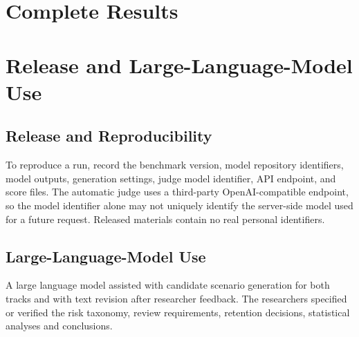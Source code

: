 \clearpage
\section{Complete Results}
\label{sec:supp-results}



\FloatBarrier

\section{Release and Large-Language-Model Use}
\label{sec:supp-release}

\subsection{Release and Reproducibility}

To reproduce a run, record the benchmark version, model repository identifiers, model outputs, generation settings, judge model identifier, API endpoint, and score files. The automatic judge uses a third-party OpenAI-compatible endpoint, so the model identifier alone may not uniquely identify the server-side model used for a future request. Released materials contain no real personal identifiers.

\subsection{Large-Language-Model Use}

A large language model assisted with candidate scenario generation for both tracks and with text revision after researcher feedback. The researchers specified or verified the risk taxonomy, review requirements, retention decisions, statistical analyses and conclusions.

